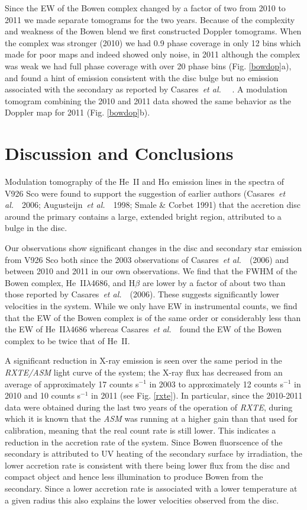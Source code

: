 \documentclass{aa}
\def\etal{{\em et al.}\ }
\begin{document}
Since the EW of the Bowen complex changed by a factor of two from 2010 to 
2011 we made separate tomograms for the two years.  
Because of the complexity and weakness of the Bowen blend we
first constructed Doppler tomograms.
When the complex was stronger (2010) we had  0.9 phase coverage in
only 12 bins which made for poor maps and indeed showed only 
noise, in 2011 although the complex was weak we had full phase
coverage with over 20 phase bins (Fig. \ref{bowdop}a), and found a hint
of emission consistent with the disc bulge but no emission  
associated with the secondary as reported by Casares~\etal~
\cite{casares}. 
A modulation tomogram combining the 2010 and 2011 data showed
the same behavior as the Doppler map for 2011 (Fig. \ref{bowdop}b).


\section{Discussion and Conclusions}

Modulation tomography of the He~II and H$\alpha$ emission lines in the spectra of V926 Sco were found to support the suggestion of earlier 
authors (Casares~\etal~2006; Augusteijn~\etal~1998; Smale
\& Corbet 1991) that the accretion disc around the primary contains a large, extended bright region, attributed to a bulge in the disc.

Our observations show significant changes in the disc and secondary
star emission from V926 Sco both since the 2003 observations of
Casares~\etal~(2006) and between 2010 and 2011 in our own observations.
We find that the FWHM of the Bowen complex, He~II$\lambda$4686, and
H$\beta$  
are lower by a factor of about two than those reported by 
Casares~\etal~(2006).  These suggests significantly lower velocities
in the system. 
While we only have
EW in instrumental counts, we find that the EW of the Bowen complex
is of the same order or considerably less than the EW of He~II$\lambda$4686
whereas Casares~\etal~found the EW of the Bowen complex to be twice
that of He~II.    
 
A significant reduction in X-ray emission is seen over the same period in the {\it RXTE/ASM} light curve of the system; the X-ray flux has decreased from an average of approximately 17 counts s$^{-1}$ in 2003 to approximately 12 counts s$^{-1}$ in 2010 and 10 counts s$^{-1}$ in 2011 (see Fig. \ref{rxte}). In
particular, since the 2010-2011 data were obtained during the last two years of the operation of {\it RXTE}, during which it is known that the {\it ASM} was running at a higher gain than that used for calibration, meaning that the real count rate is still lower. This indicates a reduction in the accretion rate of the system. 
Since Bowen fluorscence of the secondary is attributed to UV heating of the
secondary surface by irradiation, the lower accretion rate is consistent with
there being lower flux from the disc and compact object and hence
less illumination to produce Bowen from the
secondary.  Since a lower accretion rate is associated with a lower
temperature at a given radius this also explains the lower velocities
observed from the disc. 
\end{document}
